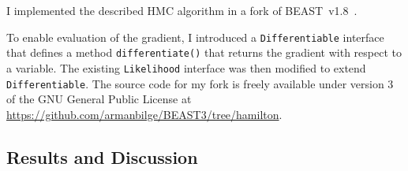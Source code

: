 \documentclass{article}
\begin{document}
    I implemented the described \ac{HMC} algorithm in a fork of
        BEAST~v1.8~\cite{Dru+12}.

    To enable evaluation of the gradient, I introduced a
        \texttt{Differentiable} interface that defines a method
        \texttt{differentiate()} that returns the gradient with respect to a
        variable.
    The existing \texttt{Likelihood} interface was then modified to extend
        \texttt{Differentiable}.
    The source code for my fork is freely available under version 3 of the GNU
        General Public License at
        \url{https://github.com/armanbilge/BEAST3/tree/hamilton}.

    \subsection*{Results and Discussion}

    \printbibliography
\end{document}
